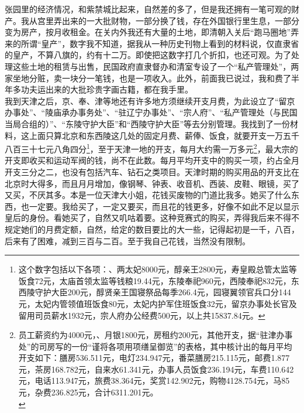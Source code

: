 张园里的经济情况，和紫禁城比起来，自然差的多了，但是我还拥有一笔可观的财产。我从宫里弄出来的一大批财物，一部分换了钱，存在外国银行里生息，一部分变为房产，按月收租金。在关内外我还有大量的土地，即清朝入关后“跑马圈地”弄来的所谓“皇产”，数字我不知道，据我从一种历史刊物上看到的材料说，仅直隶省的皇产，不算八旗的，约有十二万。即使把这数字打几个折扣，也还可观。为了处理这些土地的租赁与出售，民国政府直隶督办和清室专设了一个“私产管理处”，两家坐地分赃，卖一块分一笔钱，也是一项收入。此外，前面我已说过，我和费了半年多功夫运出来的大批珍贵字画古籍，都在我手里。\\

我到天津之后，京、奉、津等地还有许多地方须继续开支月费，为此设立了“留京办事处”、“陵庙承办事务处”、“驻辽宁办事处”、“宗人府”、“私产管理处（与民国当局合组的）”、“东陵守护大臣”和“西陵守护大臣”等去分别管理。我找到了一份材料，这上面只算北京和东西陵这几处的固定月费、薪俸、饭食，就要开支一万五千八百三十七元八角四分\footnote{这个数字包括以下各项：、两太妃8000元，醇亲王2800元，寿皇殿总管太监等饭食72元，太庙首领太监等钱粮19.44元，东陵奉祀960元，西陵奉祀832元，东西陵守护大臣200元，醇贤亲王国寝祭品每季266.4元，园寝翼领官兵口分144元，太妃内管领值班饭食80元，太妃内护军住班饭食32元，留京办事处长官及留用司员薪水1932元，宗人府办公经费500元，以上共15837.84元。}，至于天津一地的开支，每月大约需一万多元\footnote{员工薪资约为4000元，、月银1800元，房租约200元，其他开支，据“驻津办事处”的司房写的一份“谨将各项用项缮呈御览”的表格，其中核计出的每月平均开支如下：膳房536.511元，电灯234.947元，番菜膳房215.115元，邮费1.877元，茶房168.782元，自来水61.341元，办事人员饭食236.194元，车费110.642元，电话113.947元，旅费38.364元，奖赏142.902元，购物4128.754元，马85元，杂费236.825元，合计6311.201元。\\}，最大宗的开支即收买和运动军阀的钱，尚不在此数。每月平均开支中的购买一项，约占全月开支三分之二，也没有包括汽车、钻石之类项目。天津时期的购买用品的开支比在北京时大得多，而且月月增加，像钢琴、钟表、收音机、西装、皮鞋、眼镜，买了又买，不厌其多。本是一位天津大小姐，花钱买废物的门道比我多。她买了什么东西，也一定要。我给买了，一定又要买，而且花的钱更多，好像不如此不足以显示皇后的身份。看她买了，自然又叽咕着要。这种竞赛式的购买，弄得我后来不得不规定她们的月费定额，自然，给定的数目要比的大一些，记得起初是一千，八百，后来有了困难，减到三百与二百。至于我自己花钱，当然没有限制。\\

